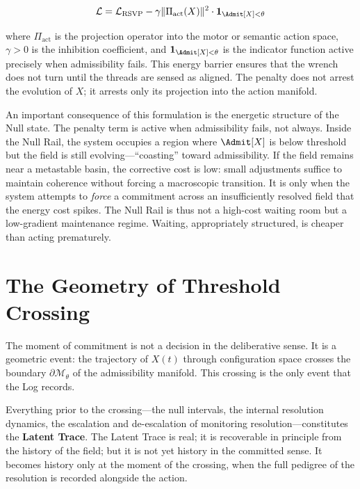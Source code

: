 \documentclass[11pt,oneside]{book}
\begin{document}
\begin{equation}
    \mathcal{L} = \mathcal{L}_{\mathrm{RSVP}} - \gamma \|\Pi_{\mathrm{act}}(X)\|^2 \cdot \mathbf{1}_{\Admit[X] < \theta}
\end{equation}

where $\Pi_{\mathrm{act}}$ is the projection operator into the motor or semantic action space, $\gamma > 0$ is the inhibition coefficient, and $\mathbf{1}_{\Admit[X] < \theta}$ is the indicator function active precisely when admissibility fails. This energy barrier ensures that the wrench does not turn until the threads are sensed as aligned. The penalty does not arrest the evolution of $X$; it arrests only its projection into the action manifold.

An important consequence of this formulation is the energetic structure of the Null state. The penalty term is active when admissibility fails, not always. Inside the Null Rail, the system occupies a region where $\Admit[X]$ is below threshold but the field is still evolving---``coasting'' toward admissibility. If the field remains near a metastable basin, the corrective cost is low: small adjustments suffice to maintain coherence without forcing a macroscopic transition. It is only when the system attempts to \textit{force} a commitment across an insufficiently resolved field that the energy cost spikes. The Null Rail is thus not a high-cost waiting room but a low-gradient maintenance regime. Waiting, appropriately structured, is cheaper than acting prematurely.

\section{The Geometry of Threshold Crossing}

The moment of commitment is not a decision in the deliberative sense. It is a geometric event: the trajectory of $X(t)$ through configuration space crosses the boundary $\partial \mathcal{M}_\theta$ of the admissibility manifold. This crossing is the only event that the Log records.

Everything prior to the crossing---the null intervals, the internal resolution dynamics, the escalation and de-escalation of monitoring resolution---constitutes the \textbf{Latent Trace}. The Latent Trace is real; it is recoverable in principle from the history of the field; but it is not yet history in the committed sense. It becomes history only at the moment of the crossing, when the full pedigree of the resolution is recorded alongside the action.
\end{document}
